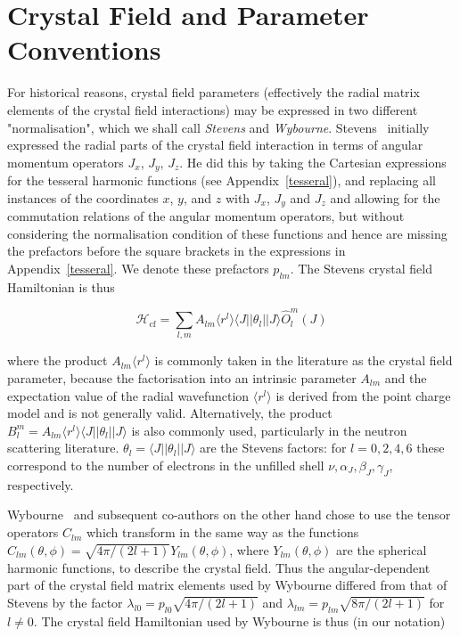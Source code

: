 \section{Crystal Field and Parameter Conventions}\label{cfparconventions}

For historical reasons, crystal field parameters (effectively the radial matrix elements of the crystal field
interactions) may be expressed in two different "normalisation", which we shall call \emph{Stevens} and 
\emph{Wybourne}. Stevens~\cite{stevens52-209,hutchings64-227} initially expressed the radial parts of the crystal field interaction
in terms of angular momentum operators $J_x$, $J_y$, $J_z$. He did this by taking the Cartesian expressions for 
the tesseral harmonic functions (see Appendix~\ref{tesseral}), and replacing all instances of the coordinates
$x$, $y$, and $z$ with $J_x$, $J_y$ and $J_z$ and allowing for the commutation relations of the angular
momentum operators, but without considering the normalisation condition of these functions and hence are missing
the prefactors before the square brackets in the expressions in Appendix~\ref{tesseral}. We denote these
prefactors $p_{lm}$. The Stevens crystal field Hamiltonian is thus

\[
\mathcal{H}_{\mathrm{cf}} = \sum_{l,m} A_{lm} \langle r^l \rangle \langle J || \theta_l || J \rangle \hat{O}_l^m (J)
\]

\noindent where the product $A_{lm} \langle r^l \rangle$ is commonly taken in the literature as the crystal
field parameter, because the factorisation into an intrinsic parameter $A_{lm}$ and the expectation value of
the radial wavefunction $\langle r^l \rangle$ is derived from the point charge model and is not generally
valid. Alternatively, the product $B_l^m = A_{lm} \langle r^l \rangle \langle J || \theta_l || J \rangle$ is
also commonly used, particularly in the neutron scattering literature. $ \theta_l= \langle J || \theta_l || J \rangle$ are the Stevens factors:  for $l=0,2,4,6$ these correspond to the number of electrons in the unfilled shell $\nu,\alpha_J,\beta_J,\gamma_J$, respectively.

Wybourne~\cite{wybourne65} and subsequent co-authors on the other hand chose to use the tensor operators 
$\hat{C}_{lm}$ which transform in the same way as the functions $C_{lm}(\theta,\phi) = \sqrt{4\pi / (2l+1)}
Y_{lm}(\theta,\phi)$, where $Y_{lm}(\theta,\phi)$ are the spherical harmonic functions, to describe the crystal
field. Thus the angular-dependent part of the crystal field matrix elements used by Wybourne differed from
that of Stevens by the factor $\lambda_{l0} = p_{l0} \sqrt{4\pi / (2l+1)}$ and
 $\lambda_{lm} = p_{lm} \sqrt{8\pi / (2l+1)}$ for $l\neq 0$. The crystal field Hamiltonian used by Wybourne is
thus (in our notation)

